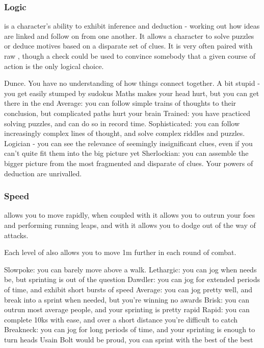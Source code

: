 \subsubsection{Logic}

 is a character's ability to exhibit inference and deduction - working out how ideas are linked and follow on from one another. It allows a character to solve puzzles or deduce motives based on a disparate set of clues. It is very often paired with raw , though a  check could be used to convince somebody that a given course of action is the only logical choice. 

\ratingTable
{Dunce. You have no understanding of how things connect together.}
{A bit stupid - you get easily stumped by sudokus}
{Maths makes your head hurt, but you can get there in the end}
{Average: you can follow simple trains of thoughts to their conclusion, but complicated paths hurt your brain}
{Trained: you have practiced solving puzzles, and can do so in record time.}
{Sophisticated: you can follow increasingly complex lines of thought, and solve complex riddles and puzzles.}
{Logician - you can see the relevance of seemingly insignificant clues, even if you can't quite fit them into the big picture yet}
{Sherlockian: you can assemble the bigger picture from the most fragmented and disparate of clues. Your powers of deduction are unrivalled.}

\subsubsection{Speed}

 allows you to move rapidly, when coupled with  it allows you to outrun your foes and performing running leaps, and with  it allows you to dodge out of the way of attacks. 

Each level of  also allows you to move 1m further in each round of combat.
 
 \ratingTable
 {Slowpoke: you can barely move above a walk.}
 {Lethargic: you can jog when needs be, but sprinting is out of the question}
 {Dawdler: you can jog for extended periods of time, and exhibit short bursts of speed}
 {Average: you can jog pretty well, and break into a sprint when needed, but you're winning no awards}
 {Brisk: you can outrun most average people, and your sprinting is pretty rapid}
 {Rapid: you can complete 10ks with ease, and over a short distance you're difficult to catch}
 {Breakneck: you can jog for long periods of time, and your sprinting is enough to turn heads}
 {Usain Bolt would be proud, you can sprint with the best of the best}


